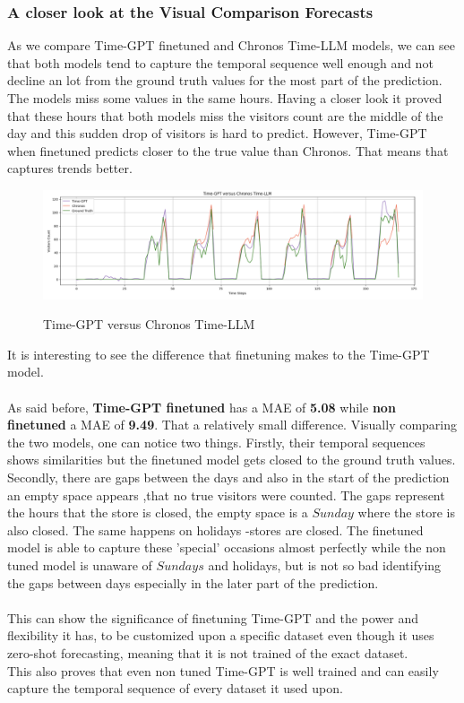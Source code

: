 \documentclass{article}
\begin{document}
\subsubsection*{A closer look at the Visual Comparison Forecasts}
As we compare Time-GPT finetuned and Chronos Time-LLM models, we can see that both models tend to capture the temporal sequence well enough and not decline an lot from the ground truth values for the most part of the prediction. The models miss some values in the same hours. Having a closer look it proved that these hours that both models miss the visitors count are the middle of the day and this sudden drop of visitors is hard to predict. However, Time-GPT when finetuned predicts closer to the true value than Chronos. That means that captures trends better.

 \begin{figure}[h]
\includegraphics[width=1\linewidth]{images/TimeGPT_versus_Chronos_Forecast.png}
    \label{fig:mesh1}
    \caption{Time-GPT versus Chronos Time-LLM}
\end{figure}

It is interesting to see the difference that finetuning makes to the Time-GPT model.\\
\\
As said before, \textbf{Time-GPT finetuned} has a MAE of \textbf{5.08} while \textbf{non finetuned} a MAE of \textbf{9.49}. That a relatively small difference. Visually comparing the two models, one can notice two things. Firstly, their temporal sequences shows similarities but the finetuned model gets closed to the ground truth values. Secondly, there are gaps between the days and also in the start of the prediction an empty space appears ,that no true visitors were counted. The gaps represent the hours that the store is closed, the empty space is a $Sunday$ where the store is also closed. The same happens on holidays -stores are closed. The finetuned model is able to capture these 'special' occasions almost perfectly while the non tuned model is unaware of $Sundays$ and holidays, but is not so bad identifying the gaps between days especially in the later part of the prediction.\\
\\
This can show the significance of finetuning Time-GPT and the power and flexibility it has, to be customized upon a specific dataset even though it uses zero-shot forecasting, meaning that it is not trained of the exact dataset.\\
This also proves that even non tuned Time-GPT is well trained and can easily capture the temporal sequence of every dataset it used upon.
\end{document}
